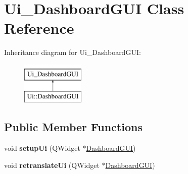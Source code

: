 \hypertarget{classUi__DashboardGUI}{}\section{Ui\+\_\+\+Dashboard\+G\+UI Class Reference}
\label{classUi__DashboardGUI}
Inheritance diagram for Ui\+\_\+\+Dashboard\+G\+UI\+:\begin{figure}[H]
\begin{center}
\leavevmode
\includegraphics[height=2.000000cm]{classUi__DashboardGUI}
\end{center}
\end{figure}
\subsection*{Public Member Functions}
\begin{DoxyCompactItemize}
\item 
void {\bfseries setup\+Ui} (Q\+Widget $\ast$\hyperlink{classDashboardGUI}{Dashboard\+G\+UI})\hypertarget{classUi__DashboardGUI_a9e5067844788f5cf58be74054ebbd8b0}{}\label{classUi__DashboardGUI_a9e5067844788f5cf58be74054ebbd8b0}

\item 
void {\bfseries retranslate\+Ui} (Q\+Widget $\ast$\hyperlink{classDashboardGUI}{Dashboard\+G\+UI})\hypertarget{classUi__DashboardGUI_a2d64e81270e5c9e1961c715b75abcfb3}{}\label{classUi__DashboardGUI_a2d64e81270e5c9e1961c715b75abcfb3}

\end{DoxyCompactItemize}
